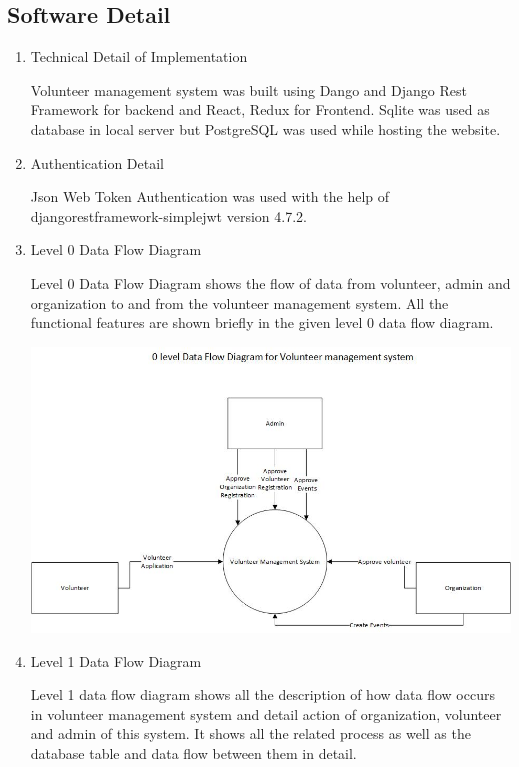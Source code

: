 \documentclass[12pt]{article}
\begin{document}
\subsection{Software Detail}
\begin{enumerate}
	\item Technical Detail of Implementation
	
	Volunteer management system was built using Dango and  Django Rest Framework for backend and React, Redux for Frontend. Sqlite was used as database in local server but PostgreSQL was used while hosting the website. 	
	
	\item Authentication Detail
	
	Json Web Token Authentication was used with the help of djangorestframework-simplejwt version 4.7.2.
	
	\item Level 0 Data Flow Diagram
	
	Level 0 Data Flow Diagram shows the flow of data from volunteer, admin and organization to and from the volunteer management system. All the functional features are shown briefly in the given level 0 data flow diagram.	
	
	\includegraphics[scale = 0.85]{DFD0.jpg}


\clearpage
\clearpage

	\item Level 1 Data Flow Diagram
	
	Level 1 data flow diagram shows all the description of how data flow occurs in volunteer management system and detail action of organization, volunteer and admin of this system. It shows all the related process as well as the database table and data flow between them in detail. 
			

\end{enumerate}
\end{document}
